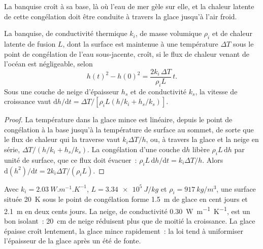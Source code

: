 La banquise croît à sa base, là où l'eau de mer gèle sur elle, et la chaleur latente
de cette congélation doit être conduite à travers la glace jusqu'à l'air froid.

\begin{theorem}\label{thm:b3:glaciology:stefan}
La banquise, de conductivité thermique $k_i$, de masse volumique $\rho_i$ et de chaleur
latente de fusion $L$, dont la surface est maintenue à une température $\Delta T$ sous le
point de congélation de l'eau sous-jacente, croît, si le flux de chaleur venant de l'océan
est négligeable, selon
\[
h(t)^2 - h(0)^2 = \frac{2k_i\,\Delta T}{\rho_iL}\,t .
\]
Sous une couche de neige d'épaisseur $h_s$ et de conductivité $k_s$, la vitesse de
croissance vaut $\mathrm dh/\mathrm dt = \Delta T/[\rho_iL(h/k_i + h_s/k_s)]$.
\end{theorem}

\begin{proof}
La température dans la glace mince est linéaire, depuis le point de congélation à la
base jusqu'à la température de surface au sommet, de sorte que le flux de chaleur qui la
traverse vaut $k_i\Delta T/h$, ou, à travers la glace et la neige en série, $\Delta T/(h/k_i +
h_s/k_s)$. La congélation d'une couche $\mathrm dh$ libère $\rho_iL\,\mathrm dh$ par
unité de surface, que ce flux doit évacuer~: $\rho_iL\,\mathrm dh/\mathrm dt
= k_i\Delta T/h$. Alors $\mathrm d(h^2)/\mathrm dt = 2k_i\Delta T/(\rho_iL)$.
\end{proof}

Avec $k_i = \qty{2.03}{W.m^{-1}.K^{-1}}$, $L = \qty{3.34e5}{J/kg}$ et
$\rho_i = \qty{917}{kg/m^3}$, une surface située \qty{20}{K} sous le point de congélation
forme \qty{1.5}{m} de glace en cent jours et \qty{2.1}{m} en deux cents jours.
La neige, de conductivité \qty{0.30}{W.m^{-1}.K^{-1}}, est un bon isolant~: \qty{20}{cm}
de neige réduisent plus que de moitié la croissance. La glace épaisse croît
lentement, la glace mince rapidement~: la loi tend à uniformiser l'épaisseur de la glace
après un été de fonte.

